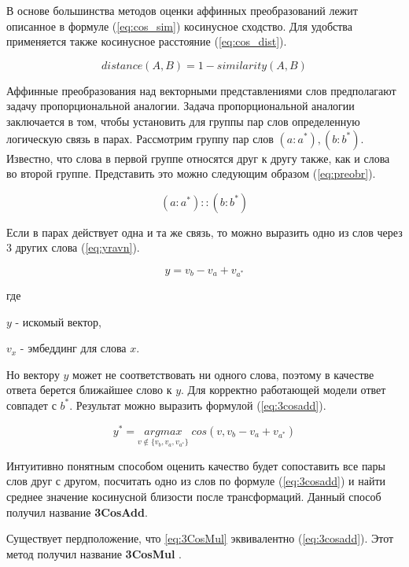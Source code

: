 \documentclass[a4paper,14pt]{article}
\begin{document}
В основе большинства методов оценки аффинных преобразований лежит описанное в формуле (\ref{eq:cos_sim}) косинусное сходство.
Для удобства применяется также косинусное расстояние (\ref{eq:cos_dist}).

\begin{equation}
	distance(A,B) = 1 - similarity(A,B)
	\label{eq:cos_dist}
\end{equation}

Аффинные преобразования над векторными представлениями слов предполагают задачу пропорциональной аналогии.
Задача пропорциональной аналогии заключается в том, чтобы установить для группы пар слов определенную логическую связь в парах.
Рассмотрим группу пар слов $(a: a^*), (b: b^*)$. 
Известно, что слова в первой группе относятся друг к другу также, как и слова во второй группе.
Представить это можно следующим образом (\ref{eq:preobr}).

\begin{equation}
	(a: a^*) :: (b: b^*)
	\label{eq:preobr}
\end{equation}

Если в парах действует одна и та же связь, то можно выразить одно из слов через 3 других слова (\ref{eq:yravn}).

\begin{equation}
	y = v_b - v_a + v_{a^*}
	\label{eq:yravn}
\end{equation}

где 

$y$ - искомый вектор,

$v_x$ - эмбеддинг для слова $x$.

Но вектору $y$ может не соответствовать ни одного слова, поэтому в качестве ответа берется ближайшее слово к $y$.
Для корректно работающей модели ответ совпадет с $b^*$.
Результат можно выразить формулой (\ref{eq:3cosadd}).

\begin{equation}
	y^* = \underset{v \notin \{v_b, v_a, v_{a^*}\}}{argmax} \; cos(v, v_b - v_a + v_{a^*})
	\label{eq:3cosadd}
\end{equation}


Интуитивно понятным способом оценить качество будет сопоставить все пары слов друг с другом, посчитать одно из слов по формуле (\ref{eq:3cosadd}) \cite{21} и найти среднее значение косинусной близости после трансформаций.
Данный способ получил название \textbf{3CosAdd}.

Существует пердположение, что \ref{eq:3CosMul} эквивалентно (\ref{eq:3cosadd}). Этот метод получил название \textbf{3CosMul} \cite{21}.
\end{document}
